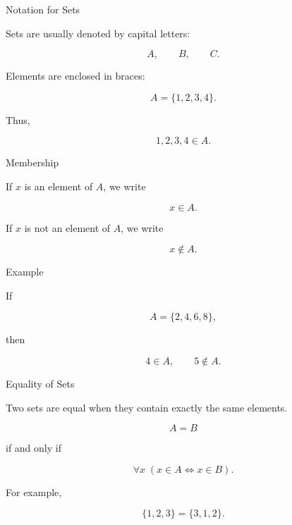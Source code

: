 \documentclass[aspectratio=169,11pt]{beamer}
\begin{document}

\begin{frame}{Notation for Sets}

Sets are usually denoted by capital letters:

\[
A,\qquad B,\qquad C.
\]

\vspace{0.3cm}

Elements are enclosed in braces:

\[
A=\{1,2,3,4\}.
\]

\vspace{0.3cm}

Thus,

\[
1,2,3,4\in A.
\]

\end{frame}


\begin{frame}{Membership}

If $x$ is an element of $A$, we write

\[
\boxed{x\in A}.
\]

\vspace{0.3cm}

If $x$ is not an element of $A$, we write

\[
\boxed{x\notin A}.
\]

\vspace{0.35cm}

\begin{exampleblock}{Example}

If

\[
A=\{2,4,6,8\},
\]

then

\[
4\in A,
\qquad
5\notin A.
\]

\end{exampleblock}

\end{frame}


\begin{frame}{Equality of Sets}

Two sets are equal when they contain exactly the same
elements.

\[
\boxed{A=B}
\]

if and only if

\[
\boxed{
\forall x\;(x\in A\iff x\in B)
}.
\]

\vspace{0.35cm}

For example,

\[
\{1,2,3\}=\{3,1,2\}.
\]

\end{frame}
\end{document}
